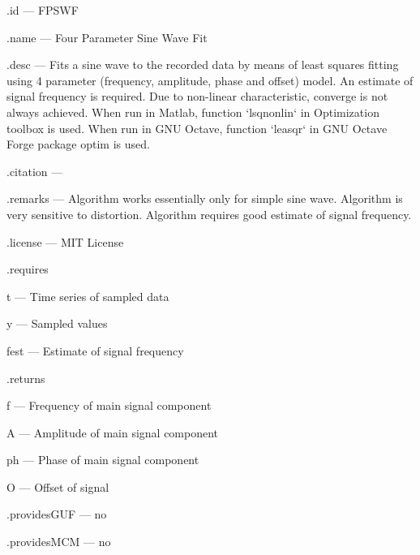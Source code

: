 \begin{tightdesc}
\item [\textsf{.id}] --- FPSWF
\item [\textsf{.name}] --- Four Parameter Sine Wave Fit
\item [\textsf{.desc}] --- Fits a sine wave to the recorded data by means of least squares fitting using 4 parameter (frequency, amplitude, phase and offset) model. An estimate of signal frequency is required. Due to non-linear characteristic, converge is not always achieved. When run in Matlab, function `lsqnonlin` in Optimization toolbox is used. When run in GNU Octave, function `leasqr` in GNU Octave Forge package optim is used.
\item [\textsf{.citation}] --- 
\item [\textsf{.remarks}] --- Algorithm works essentially only for simple sine wave. Algorithm is very sensitive to distortion. Algorithm requires good estimate of signal frequency.
\item [\textsf{.license}] --- MIT License
\item [\textsf{.requires}] \rule{0em}{0em}
\begin{tightdesc}
\item [\textsf{t}] --- Time series of sampled data
\item [\textsf{y}] --- Sampled values
\item [\textsf{fest}] --- Estimate of signal frequency
\end{tightdesc}
\item [\textsf{.returns}] \rule{0em}{0em}
\begin{tightdesc}
\item [\textsf{f}] --- Frequency of main signal component
\item [\textsf{A}] --- Amplitude of main signal component
\item [\textsf{ph}] --- Phase of main signal component
\item [\textsf{O}] --- Offset of signal
\end{tightdesc}
\item [\textsf{.providesGUF}] --- no
\item [\textsf{.providesMCM}] ---  no
\end{tightdesc}

